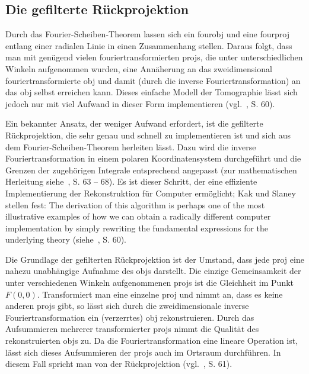 \subsection{Die gefilterte Rückprojektion}\label{ssec:filter_bp}

Durch das Fourier-Scheiben-Theorem lassen sich ein \gls{fourobj} und eine \gls{fourproj} entlang einer radialen Linie in
einen Zusammenhang stellen. Daraus folgt, dass man mit genügend vielen fouriertransformierten \glspl{proj}, die unter
unterschiedlichen Winkeln aufgenommen wurden, eine Annäherung an das zweidimensional fouriertransformierte \gls{obj} und
damit (durch die inverse Fouriertransformation) an das \gls{obj} selbst erreichen kann. Dieses einfache Modell der
Tomographie lässt sich jedoch nur mit viel Aufwand in dieser Form implementieren (vgl.~\cite{kakslan}, S. 60).

Ein bekannter Ansatz, der weniger Aufwand erfordert, ist die gefilterte Rückprojektion, die sehr genau und schnell zu
implementieren ist und sich aus dem Fourier-Scheiben-Theorem herleiten lässt. Dazu wird die inverse
Fouriertransformation in einem polaren Koordinatensystem durchgeführt und die Grenzen der zugehörigen Integrale
entsprechend angepasst (zur mathematischen Herleitung siehe~\cite{kakslan}, S. 63 -- 68). Es ist dieser Schritt, der
eine effiziente Implementierung der Rekonstruktion für Computer ermöglicht; Kak und Slaney stellen fest: {\glqq}The
derivation of this algorithm is perhaps one of the most illustrative examples of how we can obtain a radically different
computer implementation by simply rewriting the fundamental expressions for the underlying theory{\grqq}
(siehe~\cite{kakslan}, S. 60).

Die Grundlage der gefilterten Rückprojektion ist der Umstand, dass jede \gls{proj} eine nahezu unabhängige Aufnahme des
\gls{obj}s darstellt. Die einzige Gemeinsamkeit der unter verschiedenen Winkeln aufgenommenen \glspl{proj} ist die
Gleichheit im Punkt $F(0, 0)$. Transformiert man eine einzelne \gls{proj} und nimmt an, dass es keine anderen
\glspl{proj} gibt, so lässt sich durch die zweidimensionale inverse Fouriertransformation ein (verzerrtes) \gls{obj}
rekonstruieren. Durch das Aufsummieren mehrerer transformierter \glspl{proj} nimmt die Qualität des rekonstruierten
\gls{obj}s zu. Da die Fouriertransformation eine lineare Operation ist, lässt sich dieses Aufsummieren der \glspl{proj}
auch im Ortsraum durchführen. In diesem Fall spricht man von der Rückprojektion (vgl.~\cite{kakslan}, S. 61).


